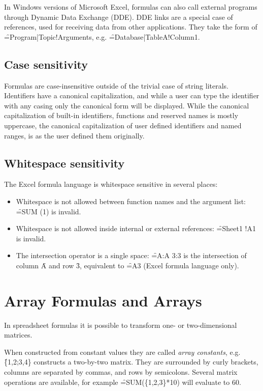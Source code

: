 In Windows versions of Microsoft Excel, formulas can also call external programs through Dynamic Data Exchange (DDE).
DDE links are a special case of references, used for receiving data from other applications.
They take the form of \f{=Program|Topic!Arguments}, e.g. \f{=Database|TableA!Column1}.

\subsection{Case sensitivity}

Formulas are case-insensitive outside of the trivial case of string literals.
Identifiers have a canonical capitalization, and while a user can type the identifier with any casing only the canonical form will be displayed.
While the canonical capitalization of built-in identifiers, functions and reserved names is mostly uppercase, the canonical capitalization of user defined identifiers and named ranges, is as the user defined them originally.

\newpage

\subsection{Whitespace sensitivity}

The Excel formula language is whitespace sensitive in several places:
\begin{itemize}
\item Whitespace is not allowed between function names and the argument list: \f{=SUM  (1)} is invalid.
\item Whitespace is not allowed inside internal or external references: \f{=Sheet1 !A1} is invalid.
\item The intersection operator is a single space: \f{=A:A 3:3} is the intersection of column \f{A} and row \f{3}, equivalent to \f{=A3} (Excel formula language only).
\end{itemize}

\section{Array Formulas and Arrays}
\label{sec:arrayformulas}
In spreadsheet formulas it is possible to transform one- or two-dimensional matrices.

When constructed from constant values they are called \emph{array constants}, e.g. \f{\{1,2;3,4\}} constructs a two-by-two matrix.
They are surrounded by curly brackets, columns are separated by commas, and rows by semicolons.
Several matrix operations are available, for example \f{=SUM(\{1,2,3\}*10)} will evaluate to 60.

